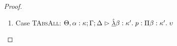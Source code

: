 \begin{proof}
\begin{enumerate}
  First, the syntax:
  \begin{tabbedproof}
    \oo By inversion, $\judgeA[\Theta, \alpha:\kappa, \beta:\kappa'; \Gamma; \Delta]{p}{\upsilon}$ \\
    \oo By induction, $\judgeA[\Theta, \beta:\kappa'; {[\tau/\alpha]}\Gamma; {[\tau/\alpha]}\Delta]{{[\tau/\alpha]}p}{{[\tau/\alpha]}\upsilon}$ \\
    \oo By rule, $\judgeA[\Theta; {[\tau/\alpha]}\Gamma; {[\tau/\alpha]}\Delta]{\pfun{\beta}{\kappa'}{{[\tau/\alpha]}p}}{\kappa' \To {[\tau/\alpha]}\upsilon}$ \\
    \oo By def of subst, $\judgeA[\Theta; {[\tau/\alpha]}\Gamma; {[\tau/\alpha]}\Delta]{{[\tau/\alpha]}(\pfun{\beta}{\kappa'}{p})}{{[\tau/\alpha]}(\kappa' \To \upsilon)}$ \\
  \end{tabbedproof}
  For semantics, consider $\interp{\judgeA[\Theta; {[\tau/\alpha]}\Gamma; {[\tau/\alpha]}\Delta]{{[\tau/\alpha]}(\pfun{\beta}{\kappa'}{p})}{{[\tau/\alpha]}(\kappa' \To \upsilon)}}\;\theta\;\gamma\;\delta$ \\
  \begin{eqnproof}
          {Semantics}
          {Induction}
          {Semantics}
  \end{eqnproof}
  The correctness of the application of $\gamma$ and $\delta$ follows from the equations for contexts
  under substitution. We also silently permuted the context at the second step, and made use of the fact
  that $\beta$ is not free in $\Gamma$ or $\Delta$.

\item Case \textsc{TAbsAll}: $\judgeA[\Theta, \alpha:\kappa; \Gamma; \Delta]{\pfunall{\beta}{\kappa'}{p}}{\forallsort{\beta}{\kappa'}{\upsilon}}$
  

\end{enumerate}
\end{proof}
